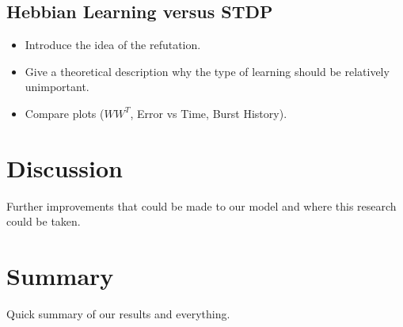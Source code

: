 \documentclass[12pt, final]{article}
\begin{document}
\subsection{Hebbian Learning versus STDP}

\begin{itemize}
\item Introduce the idea of the refutation. 
\item Give a theoretical description why the type of learning should be relatively unimportant.
\item Compare plots (\(WW^T\), Error vs Time, Burst History).
\end{itemize}

\section{Discussion}

Further improvements that could be made to our model and where this research could be taken.

\section{Summary}

Quick summary of our results and everything.





\end{document}
